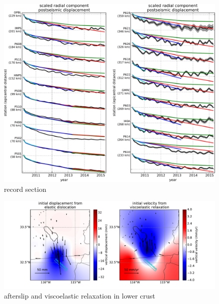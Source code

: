 \documentclass[1p]{elsarticle}
\begin{document}
\begin{figure}
\includegraphics[scale=0.6]{Figures/recordsection1}
\centering 
\caption{record section}
\label{fig:RecordSection1}
\end{figure}

\begin{figure}
\includegraphics[scale=0.6]{Figures/lower_crust}
\centering 
\caption{afterslip and viscoelastic relaxation in lower crust}
\label{fig:LowerCrust}
\end{figure}
\end{document}
